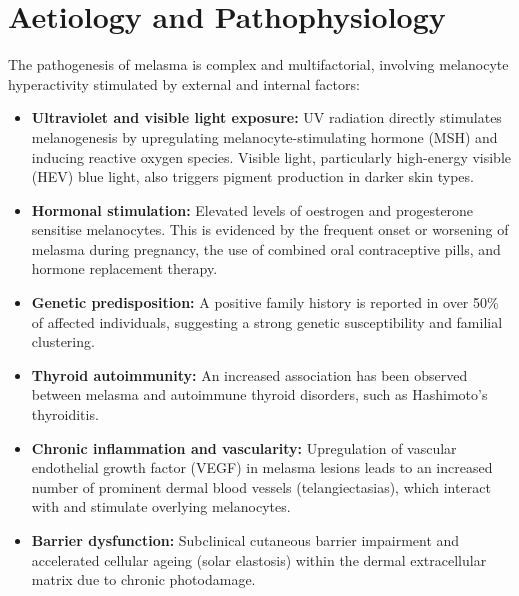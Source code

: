 \section*{Aetiology and Pathophysiology}
The pathogenesis of melasma is complex and multifactorial, involving melanocyte hyperactivity stimulated by external and internal factors:
\begin{itemize}
    \item \textbf{Ultraviolet and visible light exposure:} UV radiation directly stimulates melanogenesis by upregulating melanocyte-stimulating hormone (MSH) and inducing reactive oxygen species. Visible light, particularly high-energy visible (HEV) blue light, also triggers pigment production in darker skin types.
    \item \textbf{Hormonal stimulation:} Elevated levels of oestrogen and progesterone sensitise melanocytes. This is evidenced by the frequent onset or worsening of melasma during pregnancy, the use of combined oral contraceptive pills, and hormone replacement therapy.
    \item \textbf{Genetic predisposition:} A positive family history is reported in over 50\% of affected individuals, suggesting a strong genetic susceptibility and familial clustering.
    \item \textbf{Thyroid autoimmunity:} An increased association has been observed between melasma and autoimmune thyroid disorders, such as Hashimoto's thyroiditis.
    \item \textbf{Chronic inflammation and vascularity:} Upregulation of vascular endothelial growth factor (VEGF) in melasma lesions leads to an increased number of prominent dermal blood vessels (telangiectasias), which interact with and stimulate overlying melanocytes.
    \item \textbf{Barrier dysfunction:} Subclinical cutaneous barrier impairment and accelerated cellular ageing (solar elastosis) within the dermal extracellular matrix due to chronic photodamage.
\end{itemize}

